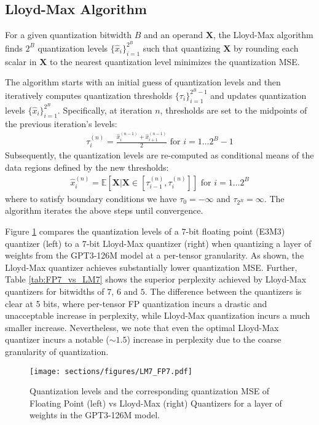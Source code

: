 \subsection{Lloyd-Max Algorithm}
\label{subsec:Lloyd-Max}
For a given quantization bitwidth $B$ and an operand $\bm{X}$, the Lloyd-Max algorithm finds $2^B$ quantization levels $\{\hat{x}_i\}_{i=1}^{2^B}$ such that quantizing $\bm{X}$ by rounding each scalar in $\bm{X}$ to the nearest quantization level minimizes the quantization MSE. 

The algorithm starts with an initial guess of quantization levels and then iteratively computes quantization thresholds $\{\tau_i\}_{i=1}^{2^B-1}$ and updates quantization levels $\{\hat{x}_i\}_{i=1}^{2^B}$. Specifically, at iteration $n$, thresholds are set to the midpoints of the previous iteration's levels:
\begin{align*}
    \tau_i^{(n)}=\frac{\hat{x}_i^{(n-1)}+\hat{x}_{i+1}^{(n-1)}}2 \text{ for } i=1\ldots 2^B-1
\end{align*}
Subsequently, the quantization levels are re-computed as conditional means of the data regions defined by the new thresholds:
\begin{align*}
    \hat{x}_i^{(n)}=\mathbb{E}\left[ \bm{X} \big| \bm{X}\in [\tau_{i-1}^{(n)},\tau_i^{(n)}] \right] \text{ for } i=1\ldots 2^B
\end{align*}
where to satisfy boundary conditions we have $\tau_0=-\infty$ and $\tau_{2^B}=\infty$. The algorithm iterates the above steps until convergence.

Figure \ref{fig:lm_quant} compares the quantization levels of a $7$-bit floating point (E3M3) quantizer (left) to a $7$-bit Lloyd-Max quantizer (right) when quantizing a layer of weights from the GPT3-126M model at a per-tensor granularity. As shown, the Lloyd-Max quantizer achieves substantially lower quantization MSE. Further, Table \ref{tab:FP7_vs_LM7} shows the superior perplexity achieved by Lloyd-Max quantizers for bitwidths of $7$, $6$ and $5$. The difference between the quantizers is clear at 5 bits, where per-tensor FP quantization incurs a drastic and unacceptable increase in perplexity, while Lloyd-Max quantization incurs a much smaller increase. Nevertheless, we note that even the optimal Lloyd-Max quantizer incurs a notable ($\sim 1.5$) increase in perplexity due to the coarse granularity of quantization. 

\begin{figure}[h]
  \centering
  \texttt{[image: sections/figures/LM7\_FP7.pdf]}
  \caption{\small Quantization levels and the corresponding quantization MSE of Floating Point (left) vs Lloyd-Max (right) Quantizers for a layer of weights in the GPT3-126M model.}
  \label{fig:lm_quant}
\end{figure}

